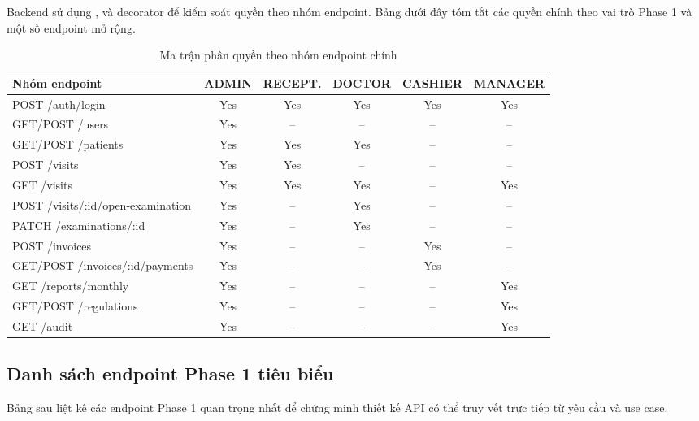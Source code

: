 Backend sử dụng ,  và decorator  để kiểm soát quyền theo nhóm endpoint. Bảng dưới đây tóm tắt các quyền chính theo vai trò Phase 1 và một số endpoint mở rộng.

\begin{longtable}{|p{5cm}|c|c|c|c|c|}
\caption{Ma trận phân quyền theo nhóm endpoint chính}\\
\hline
\textbf{Nhóm endpoint} & \textbf{ADMIN} & \textbf{RECEPT.} & \textbf{DOCTOR} & \textbf{CASHIER} & \textbf{MANAGER} \\
\hline
POST /auth/login & Yes & Yes & Yes & Yes & Yes \\
\hline
GET/POST /users & Yes & -- & -- & -- & -- \\
\hline
GET/POST /patients & Yes & Yes & Yes & -- & -- \\
\hline
POST /visits & Yes & Yes & -- & -- & -- \\
\hline
GET /visits & Yes & Yes & Yes & -- & Yes \\
\hline
POST /visits/:id/open-examination & Yes & -- & Yes & -- & -- \\
\hline
PATCH /examinations/:id & Yes & -- & Yes & -- & -- \\
\hline
POST /invoices & Yes & -- & -- & Yes & -- \\
\hline
GET/POST /invoices/:id/payments & Yes & -- & -- & Yes & -- \\
\hline
GET /reports/monthly & Yes & -- & -- & -- & Yes \\
\hline
GET/POST /regulations & Yes & -- & -- & -- & Yes \\
\hline
GET /audit & Yes & -- & -- & -- & Yes \\
\hline
\end{longtable}

\subsection{Danh sách endpoint Phase 1 tiêu biểu}

Bảng sau liệt kê các endpoint Phase 1 quan trọng nhất để chứng minh thiết kế API có thể truy vết trực tiếp từ yêu cầu và use case.

